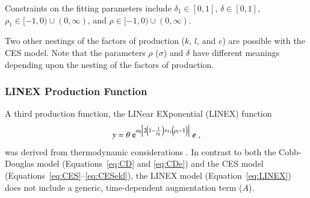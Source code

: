 \documentclass[preprint,authoryear,12pt]{elsarticle}\usepackage[]{graphicx}\usepackage[]{color}
\begin{document}
Constraints on the fitting parameters include 
$\delta_1 \in [0,1]$,
$\delta \in [0,1]$,
$\rho_1 \in [-1,0) \cup (0,\infty)$, and
$\rho \in [-1,0) \cup (0,\infty)$. 

Two other nestings of the factors of production ($k$, $l$, and $e$)
are possible with the CES model.
%
\ceslek{\label{eq:CESlek}}
%
\cesekl{\label{eq:CESekl}}
%
\noindent Note that the parameters $\rho$ ($\sigma$) and $\delta$ have different
meanings depending upon the nesting of the factors of production.


\subsubsection{LINEX Production Function} 
\label{sec:LINEX}

A third production function, the LINear EXponential (LINEX) function
%
\begin{equation} \label{eq:LINEX}
  y = \theta \; \mathrm{e}^{a_0\left[2 \left(1 - \frac{1}{\rho_k} \right) 
    + c_t \left(\vphantom{\frac{1}{\rho_k}}\rho_l - 1 \right)\right]} \; e \;,
\end{equation}
%
was derived from thermodynamic considerations
\citep{Kummel:1980wx,Kummel:1982vy,Kummel:1985vz,Kummel:1989tf,Kummel:2002tx,Kummel:2010vz}. 
In contrast to both the Cobb-Douglas model (Equations~\ref{eq:CD} and 
\ref{eq:CDe}) and the CES model (Equations~\ref{eq:CES}--\ref{eq:CESekl}), 
the LINEX model (Equation~\ref{eq:LINEX}) does not include a generic, 
time-dependent augmentation term ($A$).
\end{document}
